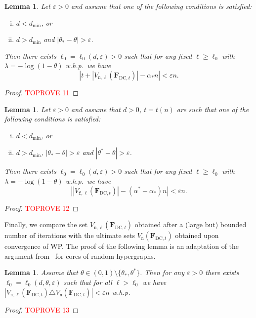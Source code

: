 \documentclass[10pt,reqno]{amsart}
\numberwithin{equation}{section}
\renewcommand{\vec}[1]{\boldsymbol{#1}}
\newcommand\dmin{d_{\mathrm{min}}}
\newcommand{\FDC}[1]{\PHI_{\mathrm{DC},{#1}}}
\newcommand{\frozen}{\mathtt{f}}
\newcommand{\nll}{\mathtt{n}}
\newcommand{\fzn}{\frozen}
\newcommand\PHI{\vec F}
\newcommand\eps{\varepsilon}
\newcommand\abs[1]{\left|{#1}\right|}
\newcommand{\whp}{w.h.p.}
\newtheorem{lemma}[definition]{Lemma}
\begin{document}
\begin{lemma}\label{lem_WP_n}
	Let $\eps>0$ and assume that one of the following conditions is satisfied:
	\begin{enumerate}[(i)]
		\item $d<\dmin$, or
		\item $d>\dmin$ and $|\theta_*-\theta|>\eps$. \end{enumerate}
	Then there exists $\ell_0=\ell_0(d,\eps)>0$ such that for any fixed $\ell\geq\ell_0$ with $\lambda=-\log(1-\theta)$ \whp\ we have
	$$\abs{t+|V_{\nll,\ell}(\FDC{t})|-\alpha_*n}<\eps n.$$
\end{lemma}
\begin{proof}\textcolor{red}{TOPROVE 11}\end{proof}


\begin{lemma}\label{lem_WP_f}
	Let $\eps>0$ and assume that $d>0$, $t=t(n)$ are such that one of the following conditions is satisfied:
	\begin{enumerate}[(i)]
		\item $d<\dmin$, or
		\item $d>\dmin$, $|\theta_*-\theta|>\eps$ and $|\theta^*-\theta|>\eps$.
	\end{enumerate}
	Then there exists $\ell_0=\ell_0(d,\eps)>0$ such that for any fixed $\ell\geq\ell_0$ with $\lambda=-\log(1-\theta)$ \whp\ we have 
	$$
	\abs{|V_{\fzn,\ell}(\FDC{t})|-(\alpha^*-\alpha_*)n}<\eps n.
	$$
\end{lemma}
\begin{proof}\textcolor{red}{TOPROVE 12}\end{proof}

Finally, we compare the set $V_{\nll,\ell}(\FDC{t})$ obtained after a (large but) bounded number of iterations with the ultimate sets $V_{\nll}(\FDC{t})$ obtained upon convergence of WP.
The proof of the following lemma is an adaptation of the argument from~\cite{Molloy} for cores of random hypergraphs.

\begin{lemma}\label{lem_WP_n_infty}
	Assume that $\theta\in(0,1)\setminus\{\theta_*,\theta^*\}$.
	Then for any $\eps>0$ there exists $\ell_0=\ell_0(d,\theta, \eps)$ such that for all $\ell>\ell_0$ we have $|V_{\nll,\ell}(\FDC{t})\triangle V_{\nll}(\FDC{t})|<\eps n$ \whp
\end{lemma}
\begin{proof}\textcolor{red}{TOPROVE 13}\end{proof}
\end{document}
